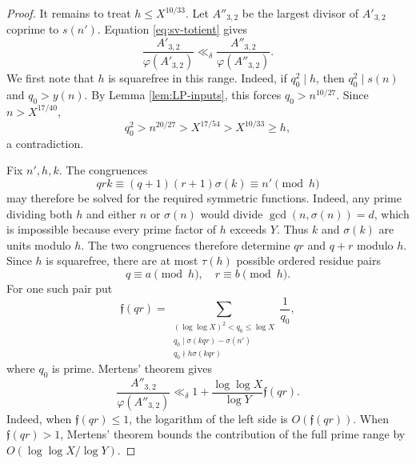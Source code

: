 \documentclass[11pt,letterpaper,reqno]{amsart}
\numberwithin{equation}{section}
\theoremstyle{remark}
\newcommand{\1}{\mathbf 1}
\renewcommand{\leq}{\leqslant}
\renewcommand{\geq}{\geqslant}
\begin{document}
\begin{proof}
It remains to treat $h\leq X^{10/33}$. Let $A''_{3,2}$ be the largest
divisor of $A'_{3,2}$ coprime to $s(n')$. Equation
\eqref{eq:sv-totient} gives
\[
 \frac{A'_{3,2}}{\varphi(A'_{3,2})}
 \ll_\delta\frac{A''_{3,2}}{\varphi(A''_{3,2})}.
\]
We first note that $h$ is squarefree in this range. Indeed, if
$q_0^2\mid h$, then $q_0^2\mid s(n)$ and $q_0>y(n)$. By
Lemma \ref{lem:LP-inputs}, this forces $q_0>n^{10/27}$. Since
$n>X^{17/40}$,
\[
 q_0^2>n^{20/27}>X^{17/54}>X^{10/33}\geq h,
\]
a contradiction.

Fix $n',h,k$. The congruences
\[
 qrk\equiv(q+1)(r+1)\sigma(k)\equiv n'\pmod h
\]
may therefore be solved for the required symmetric functions. Indeed, any prime
dividing both $h$ and either $n$ or $\sigma(n)$ would divide
$\gcd(n,\sigma(n))=d$, which is impossible because every prime factor of
$h$ exceeds $Y$. Thus $k$ and $\sigma(k)$ are units modulo $h$. The two
congruences therefore
determine $qr$ and $q+r$ modulo $h$. Since $h$ is squarefree, there are at
most $\tau(h)$ possible ordered residue pairs
\[
 q\equiv a\pmod h,\quad r\equiv b\pmod h.
\]
For one such pair put
\[
 \mathfrak{f}(qr)=
 \sum_{\substack{(\log\log X)^2<q_0\leq\log X\\
 q_0\mid\sigma(kqr)-\sigma(n')\\
 q_0\nmid h\sigma(kqr)}}\frac1{q_0},
\]
where $q_0$ is prime. Mertens' theorem gives
\begin{equation}\label{eq:sv-intermediate-totient}
 \frac{A''_{3,2}}{\varphi(A''_{3,2})}
 \ll_\delta 1+\frac{\log\log X}{\log Y}\mathfrak{f}(qr).
\end{equation}
Indeed, when $\mathfrak{f}(qr)\leq1$, the logarithm of the left side is
$O(\mathfrak{f}(qr))$. When $\mathfrak{f}(qr)>1$, Mertens' theorem bounds
the contribution of the full prime range by
$O(\log\log X/\log Y)$.


\end{proof}
\end{document}
